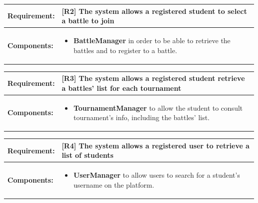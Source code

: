 \documentclass[12pt,oneside,a4paper]{article}
\begin{document}
\begin{table}[htbp]
\begin{tabular}{|l|p{12cm}|}
    \hline
    \textbf{Requirement:} & [R2] The system allows a registered student to select a battle to join\\
    \hline
    \textbf{Components:} & \begin{itemize}
        \item \textbf{BattleManager} in order to be able to retrieve the battles and to register to a battle.
    \end{itemize}\\
    \hline
\end{tabular}
\end{table}

\begin{table}[htbp]
\begin{tabular}{|l|p{12cm}|}
    \hline
    \textbf{Requirement:} & [R3] The system allows a registered student retrieve a battles’ list for each tournament\\
    \hline
    \textbf{Components:} & \begin{itemize}
        \item \textbf{TournamentManager} to allow the student to consult tournament's info, including the battles' list.
    \end{itemize}\\
    \hline
\end{tabular}
\end{table}

\begin{table}[htbp]
\begin{tabular}{|l|p{12cm}|}
    \hline
    \textbf{Requirement:} & [R4] The system allows a registered user to retrieve a list of students\\
    \hline
    \textbf{Components:} & \begin{itemize}
        \item \textbf{UserManager} to allow users to search for a student's username on the platform.
    \end{itemize}\\
    \hline
\end{tabular}
\end{table}
\end{document}
